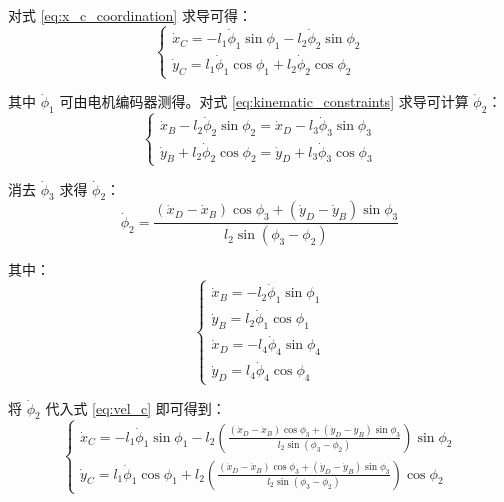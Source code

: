 \documentclass[
  oneside,
  degree=bachelor,
  fullwidthstop=false,
  fontset=fandol,
  times=false,
  minted=true,
  biblatex=true,
]{tongjithesis}
\begin{document}
对式 \eqref{eq:x_c_coordination} 求导可得：
\begin{equation}
    \begin{cases}
        \dot{x}_C = -l_1 \dot{\phi}_1 \sin \phi_1 - l_2 \dot{\phi}_2 \sin \phi_2 \\
        \dot{y}_C = l_1 \dot{\phi}_1 \cos \phi_1 + l_2 \dot{\phi}_2 \cos \phi_2
    \end{cases}
    \label{eq:vel_c}
\end{equation}

其中 $\dot{\phi}_1$ 可由电机编码器测得。对式 \eqref{eq:kinematic_constraints} 求导可计算 $\dot{\phi}_2$：
\begin{equation}
    \begin{cases}
        \dot{x}_B - l_2 \dot{\phi}_2 \sin \phi_2 = \dot{x}_D - l_3 \dot{\phi}_3 \sin \phi_3 \\
        \dot{y}_B + l_2 \dot{\phi}_2 \cos \phi_2 = \dot{y}_D + l_3 \dot{\phi}_3 \cos \phi_3
    \end{cases}
    \label{eq:vel_b_d}
\end{equation}

消去 $\dot{\phi}_3$ 求得 $\dot{\phi}_2$：
\begin{equation}
    \dot{\phi}_2 = \frac{(\dot{x}_D - \dot{x}_B) \cos \phi_3 + (\dot{y}_D - \dot{y}_B) \sin \phi_3}{l_2 \sin(\phi_3 - \phi_2)}
\end{equation}

其中：
\begin{equation}
    \begin{cases}
        \dot{x}_B = -l_2 \dot{\phi}_1 \sin \phi_1 \\
        \dot{y}_B = l_2 \dot{\phi}_1 \cos \phi_1 \\
        \dot{x}_D = -l_4 \dot{\phi}_4 \sin \phi_4 \\
        \dot{y}_D = l_4 \dot{\phi}_4 \cos \phi_4
    \end{cases}
\end{equation}

将 $\dot{\phi}_2$ 代入式 \eqref{eq:vel_c} 即可得到：
\begin{equation}
    \begin{cases}
        \dot{x}_C = -l_1 \dot{\phi}_1 \sin \phi_1 - l_2 \left( \frac{(\dot{x}_D - \dot{x}_B) \cos \phi_3 + (\dot{y}_D - \dot{y}_B) \sin \phi_3}{l_2 \sin(\phi_3 - \phi_2)} \right) \sin \phi_2 \\
        \dot{y}_C = l_1 \dot{\phi}_1 \cos \phi_1 + l_2 \left( \frac{(\dot{x}_D - \dot{x}_B) \cos \phi_3 + (\dot{y}_D - \dot{y}_B) \sin \phi_3}{l_2 \sin(\phi_3 - \phi_2)} \right) \cos \phi_2
    \end{cases}
\end{equation}
\end{document}
